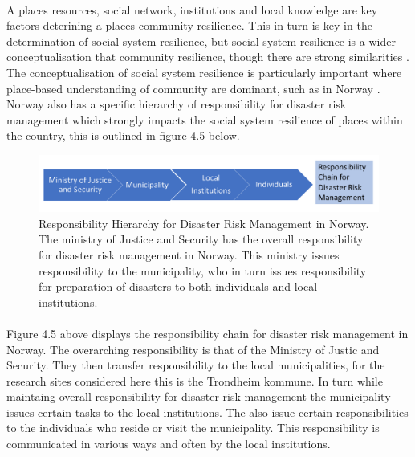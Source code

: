 \paragraph{}

A places resources, social network, institutions and local knowledge are key factors deterining a places community resilience. This in turn is key in the determination of social system resilience, but social system resilience is a wider conceptualisation that community resilience, though there are strong similarities \cite{cutter_community_2020}. The conceptualisation of social system resilience is particularly important where place-based understanding of community are dominant, such as in Norway \cite{rasanen_conceptualizing_2020}. Norway also has a specific hierarchy of responsibility for disaster risk management which strongly impacts the social system resilience of places within the country, this is outlined in figure 4.5 below.


\begin{figure} [h]
    \centering
    \includegraphics[width=1\textwidth]{fig_theory/responsibility drm.png}
    \caption{Responsibility Hierarchy for Disaster Risk Management in Norway. The ministry of Justice and Security has the overall responsibility for disaster risk management in Norway. This ministry issues responsibility to the municipality, who in turn issues responsibility for preparation of disasters to both individuals and local institutions.}
    \label{fig:drm_responsibility}
\end{figure}
\paragraph{}
Figure 4.5 above displays the responsibility chain for disaster risk management in Norway. The overarching responsibility is that of the Ministry of Justic and Security. They then transfer responsibility to the local municipalities, for the research sites considered here this is the Trondheim kommune. In turn while maintaing overall responsibility for disaster risk management the municipality issues certain tasks to the local institutions. The also issue certain responsibilities to the individuals who reside or visit the municipality. This responsibility is communicated in various ways and often by the local institutions. 





